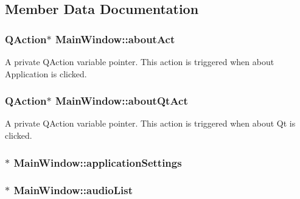 \subsection{Member Data Documentation}
\hypertarget{classMainWindow_a07b31cf99def3b2de7958ffaf2eec463}{
\subsubsection[{aboutAct}]{\setlength{\rightskip}{0pt plus 5cm}QAction$\ast$ {\bf MainWindow::aboutAct}}}
\label{classMainWindow_a07b31cf99def3b2de7958ffaf2eec463}
A private QAction variable pointer. This action is triggered when about Application is clicked. \hypertarget{classMainWindow_ace057e46f03ed0988c768e7d185bae2b}{
\subsubsection[{aboutQtAct}]{\setlength{\rightskip}{0pt plus 5cm}QAction$\ast$ {\bf MainWindow::aboutQtAct}}}
\label{classMainWindow_ace057e46f03ed0988c768e7d185bae2b}
A private QAction variable pointer. This action is triggered when about Qt is clicked. \hypertarget{classMainWindow_ac0a6beb7a11b29e341674239c41cec24}{
\subsubsection[{applicationSettings}]{$\ast$ {\bf MainWindow::applicationSettings}}}
\label{classMainWindow_ac0a6beb7a11b29e341674239c41cec24}
\hypertarget{classMainWindow_a662b41536f24ae8944b1fcd7c3c61d65}{
\subsubsection[{audioList}]{$\ast$ {\bf MainWindow::audioList}}}

